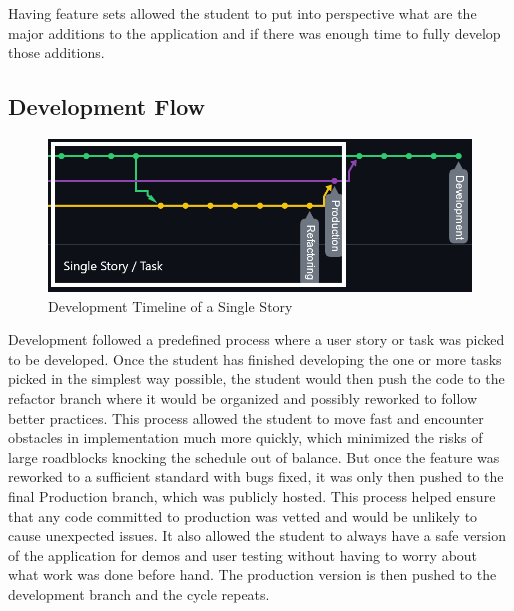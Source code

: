 Having feature sets allowed the student to put into perspective what are the major additions to the application and if there was enough time to fully develop those additions.

\subsection{Development Flow}
\begin{figure}
    \centering
    \includegraphics[width=1\columnwidth]{author-files/figures/SingleStoryPath2.png}
    \caption{Development Timeline of a Single Story}
    \label{fig:singlestory}
\end{figure}

Development followed a predefined process where a user story or task was picked to be developed. Once the student has finished developing the one or more tasks picked in the simplest way possible, the student would then push the code to the refactor branch where it would be organized and possibly reworked to follow better practices. This process allowed the student to move fast and encounter obstacles in implementation much more quickly, which minimized the risks of large roadblocks knocking the schedule out of balance. But once the feature was reworked to a sufficient standard with bugs fixed, it was only then pushed to the final Production branch, which was publicly hosted.
This process helped ensure that any code committed to production was vetted and would be unlikely to cause unexpected issues. It also allowed the student to always have a safe version of the application for demos and user testing without having to worry about what work was done before hand.
The production version is then pushed to the development branch and the cycle repeats.


